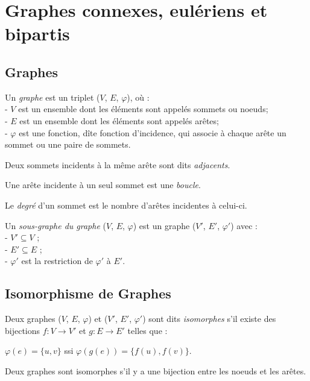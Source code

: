 \section{Graphes connexes, eulériens et bipartis }
\subsection{Graphes}

\begin{mydef}
  Un \emph{graphe} est un triplet ($V$, $E$, $\varphi$), où :\\
  - $V$ est un ensemble dont les éléments sont appelés sommets ou noeuds; \\
  - $E$ est un ensemble dont les éléments sont appelés arêtes; \\
  - $\varphi$ est une fonction, dîte fonction d'incidence, qui associe à chaque arête un sommet ou une paire de sommets.
\end{mydef}

\begin{mydef}
  Deux sommets incidents à la même arête sont dits \emph{adjacents}.
\end{mydef}

\begin{mydef}
  Une arête incidente à un seul sommet est une \emph{boucle}.
\end{mydef}

\begin{mydef}
  Le \emph{degré} d'un sommet est le nombre d'arêtes incidentes à celui-ci.
\end{mydef}

\begin{mydef}
  Un \emph{sous-graphe du graphe} ($V$, $E$, $\varphi$) est un graphe ($V'$, $E'$, $\varphi'$) avec : \\
  - $V' \subseteq V$ ; \\
  - $E' \subseteq E$ ; \\
  - $\varphi'$ est la restriction de $\varphi'$ à $E'$.
\end{mydef}

\subsection{Isomorphisme de Graphes}
\begin{mydef}
  Deux graphes ($V$, $E$, $\varphi$) et ($V'$, $E'$, $\varphi'$) sont dits \emph{isomorphes} s'il existe des bijections $f:V \to V'$ et $g:E \to E'$ telles que :
  \begin{center}
    $\varphi(e) = \{u, v\}$ ssi $\varphi(g(e)) = \{f(u), f(v)\}$.
  \end{center}
  Deux graphes sont isomorphes s'il y a une bijection entre les noeuds et les arêtes.
\end{mydef}

